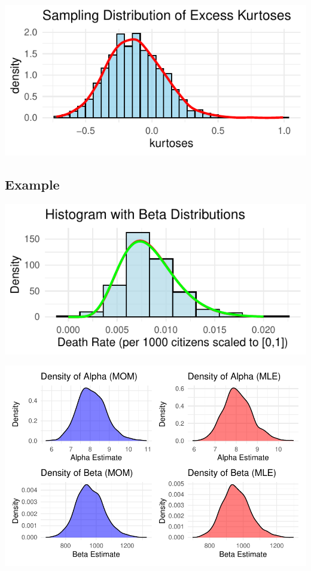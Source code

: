 \documentclass{article}\usepackage[]{graphicx}\usepackage[]{xcolor}
\makeatletter
\def\maxwidth{ %
  \ifdim\Gin@nat@width>\linewidth
    \linewidth
  \else
    \Gin@nat@width
  \fi
}
\newenvironment{knitrout}{}{} %
\makeatother
\begin{document}
\begin{knitrout}
\color{fgcolor}
\includegraphics[width=\maxwidth]{figure/unnamed-chunk-9-1} 
\end{knitrout}

\subsection{Example}
\begin{knitrout}
\color{fgcolor}
\includegraphics[width=\maxwidth]{figure/unnamed-chunk-10-1} 
\end{knitrout}

\begin{knitrout}
\color{fgcolor}
\includegraphics[width=\maxwidth]{figure/unnamed-chunk-11-1} 
\end{knitrout}
\end{document}
